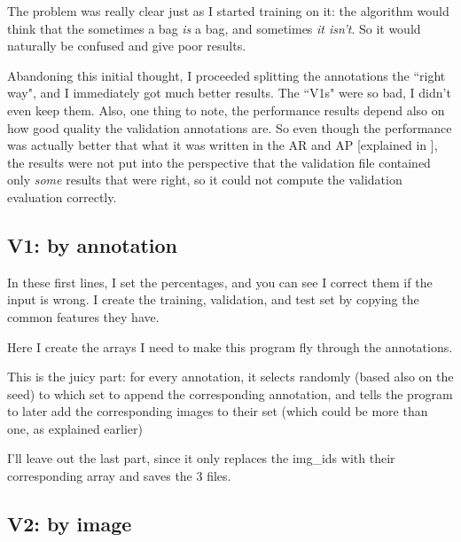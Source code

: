 The problem was really clear just as I started training on it: the algorithm would think that the sometimes a bag \emph{is} a bag, and sometimes \emph{it isn't}. So it would naturally be confused and give poor results.

Abandoning this initial thought, I proceeded splitting the annotations the “right way", and I immediately got much better results. The “V1s" were so bad, I didn't even keep them. Also, one thing to note, the performance results depend also on how good quality the validation annotations are. So even though the performance was actually better that what it was written in the AR and AP [explained in ], the results were not put into the perspective that the validation file contained only \emph{some} results that were right, so it could not compute the validation evaluation correctly.

\subsection{V1: by annotation}\label{s:splitting-1}



In these first lines, I set the percentages, and you can see I correct them if the input is wrong.
I create the training, validation, and test set by copying the common features they have.



Here I create the arrays I need to make this program fly through the annotations.



This is the juicy part: for every annotation, it selects randomly (based also on the seed) to which set to append the corresponding annotation, and tells the program to later add the corresponding images to their set (which could be more than one, as explained earlier)

I'll leave out the last part, since it only replaces the img\_ids with their corresponding array and saves the 3 files.

\subsection{V2: by image}\label{s:splitting-2}

